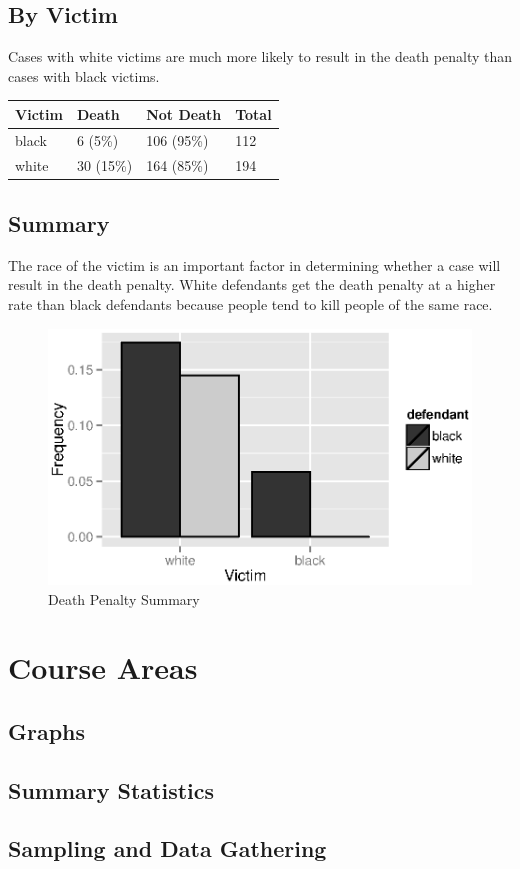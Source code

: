 \documentclass{exam}
\begin{document}
  \subsection{By Victim}

  Cases with white victims are much more likely to result in the death penalty than cases with black victims.
  \begin{table}[H]
    \centering
    \begin{tabular}{llll}
      \toprule
      Victim & Death     & Not Death  & Total \\
      \midrule
      black  & 6 (5\%)   & 106 (95\%) & 112 \\
      white  & 30 (15\%) & 164 (85\%) & 194 \\
      \bottomrule
    \end{tabular}
  \end{table}

  \subsection{Summary}
  The race of the victim is an important factor in determining whether a case will result in the death penalty.  White
  defendants get the death penalty at a higher rate than black defendants because people tend to kill people of the same
  race.

  \begin{figure}[H]
    \centering
    \includegraphics[scale = 0.9]{figures/death_penalty.eps}
    \caption{Death Penalty Summary}
  \end{figure}

  \section{Course Areas}

  \subsection{Graphs}

  \subsection{Summary Statistics}

  \subsection{Sampling and Data Gathering}
\end{document}
